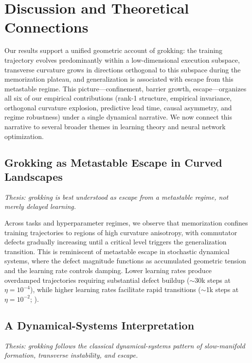 \documentclass[11pt]{article}
\begin{document}
\section{Discussion and Theoretical Connections}
\label{sec:discussion}

Our results support a unified geometric account of grokking: the training trajectory evolves predominantly within a low-dimensional execution subspace, transverse curvature grows in directions orthogonal to this subspace during the memorization plateau, and generalization is associated with escape from this metastable regime.
This picture---confinement, barrier growth, escape---organizes all six of our empirical contributions (rank-1 structure, empirical invariance, orthogonal curvature explosion, predictive lead time, causal asymmetry, and regime robustness) under a single dynamical narrative.
We now connect this narrative to several broader themes in learning theory and neural network optimization.

\subsection{Grokking as Metastable Escape in Curved Landscapes}
\label{sec:disc_metastable}

\emph{Thesis: grokking is best understood as escape from a metastable regime, not merely delayed learning.}

Across tasks and hyperparameter regimes, we observe that memorization confines training trajectories to regions of high curvature anisotropy, with commutator defects gradually increasing until a critical level triggers the generalization transition.
This is reminiscent of metastable escape in stochastic dynamical systems, where the defect magnitude functions as accumulated geometric tension and the learning rate controls damping.
Lower learning rates produce overdamped trajectories requiring substantial defect buildup ($\sim$30k steps at $\eta = 10^{-4}$), while higher learning rates facilitate rapid transitions ($\sim$1k steps at $\eta = 10^{-2}$; ).

\subsection{A Dynamical-Systems Interpretation}
\label{sec:disc_dynamical}

\emph{Thesis: grokking follows the classical dynamical-systems pattern of slow-manifold formation, transverse instability, and escape.}
\end{document}
